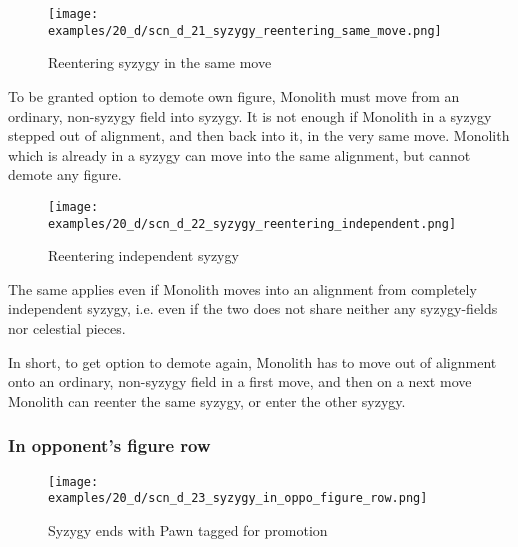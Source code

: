 \vspace*{-1.2\baselineskip}
\noindent
\begin{figure}[!h]
\texttt{[image: examples/20\_d/scn\_d\_21\_syzygy\_reentering\_same\_move.png]}
\caption{Reentering syzygy in the same move}
\label{fig:scn_d_21_syzygy_reentering_same_move}
\end{figure}

To be granted option to demote own figure, Monolith must move from an ordinary, non-syzygy field into syzygy. It is
not enough if Monolith in a syzygy stepped out of alignment, and then back into it, in the very same move. Monolith
which is already in a syzygy can move into the same alignment, but cannot demote any figure.

\clearpage %

\noindent
\begin{figure}[!h]
\texttt{[image: examples/20\_d/scn\_d\_22\_syzygy\_reentering\_independent.png]}
\caption{Reentering independent syzygy}
\label{fig:scn_d_22_syzygy_reentering_independent}
\end{figure}

The same applies even if Monolith moves into an alignment from completely independent syzygy, i.e. even if the two does
not share neither any syzygy-fields nor celestial pieces.

In short, to get option to demote again, Monolith has to move out of alignment onto an ordinary, non-syzygy field in a
first move, and then on a next move Monolith can reenter the same syzygy, or enter the other syzygy.

\clearpage %

\subsubsection*{In opponent's figure row}

\vspace*{-1.2\baselineskip}
\noindent
\begin{figure}[!h]
\texttt{[image: examples/20\_d/scn\_d\_23\_syzygy\_in\_oppo\_figure\_row.png]}
\caption{Syzygy ends with Pawn tagged for promotion}
\label{fig:scn_d_23_syzygy_in_oppo_figure_row}
\end{figure}

